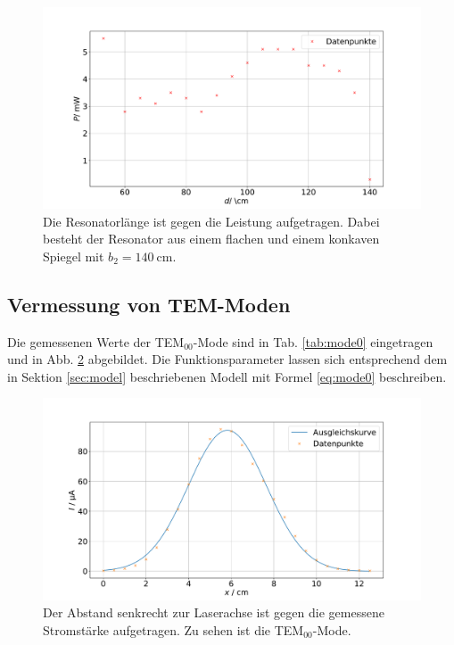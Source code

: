 

\begin{figure}
    \centering
    \includegraphics[width=15cm]{plots/stability_flat.pdf}
    \caption{Die Resonatorlänge ist gegen die Leistung aufgetragen. Dabei besteht der Resonator aus einem flachen und einem konkaven Spiegel mit $b_2 = \SI{140}{\centi\meter}$.}
    \label{fig:stability_flat}
\end{figure} 

\subsection{Vermessung von TEM-Moden}

Die gemessenen Werte der TEM$_{00}$-Mode sind in Tab. \ref{tab:mode0} eingetragen und in Abb. \ref{fig:mode0} abgebildet. 
Die Funktionsparameter lassen sich entsprechend dem in Sektion \ref{sec:model} beschriebenen Modell mit Formel \eqref{eq:mode0} beschreiben.


\begin{figure}
    \centering
    \includegraphics[width=\textwidth]{plots/mode0.pdf}
    \caption{Der Abstand senkrecht zur Laserachse ist gegen die gemessene Stromstärke aufgetragen. Zu sehen ist die TEM$_{00}$-Mode.}
    \label{fig:mode0}
\end{figure}

